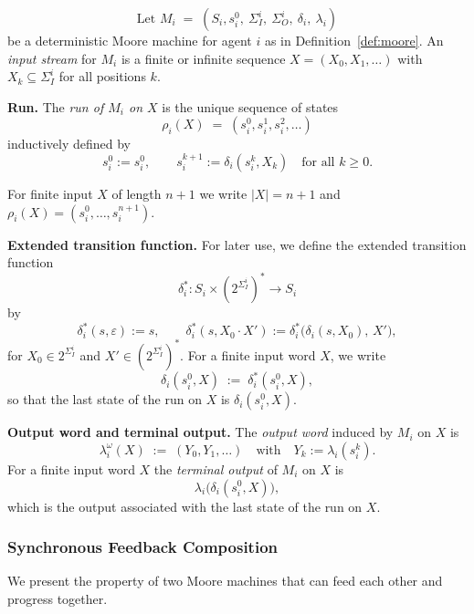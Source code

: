   \begin{definition}
    \label{def:moore-run}
    \[\text{Let }
    M_i \;=\; (S_i, s^0_i,\ \Sigma_I^i,\ \Sigma_O^i,\ \delta_i,\ \lambda_i)
    \]
    be a deterministic Moore machine for agent $i$ as in Definition~\ref{def:moore}.
    An \emph{input stream} for $M_i$ is a finite or infinite sequence 
    $X = (X_0,X_1,\dots)$ with $X_k \subseteq \Sigma_I^i$ for all positions $k$.
    
    \medskip
    \noindent\textbf{Run.}
    The \emph{run of $M_i$ on $X$} is the unique sequence of states
    \[
    \rho_i(X) \;=\; (s^0_i,s^1_i,s^2_i,\dots)
    \]
    inductively defined by
    \[
    s^{0}_i := s^0_i,
    \qquad
    s^{k+1}_i := \delta_i(s^k_i, X_k)
    \quad\text{for all }k \ge 0.
    \]
    
    \noindent For finite input $X$ of length $n{+}1$ we write $|X|=n{+}1$ and 
    $\rho_i(X) = (s^0_i,\dots,s^{n+1}_i)$.
    
    \medskip
    \noindent\textbf{Extended transition function.}
    For later use, we define the extended transition function
    \[
    \delta_i^{*} : S_i \times (2^{\Sigma_I^i})^{*} \to S_i
    \]
    by
    \[
    \delta_i^{*}(s, \varepsilon) := s,
    \qquad
    \delta_i^{*}(s, X_0\cdot X') := 
    \delta_i^{*}\bigl(\delta_i(s,X_0),\,X'\bigr),
    \]
    for $X_0 \in 2^{\Sigma_I^i}$ and $X' \in (2^{\Sigma_I^i})^{*}$.
    For a finite input word $X$, we write
    \[
    \delta_i(s^0_i,X) \;:=\; \delta_i^{*}(s^0_i,X),
    \]
    so that the last state of the run on $X$ is $\delta_i(s^0_i,X)$.
    
    \medskip
    \noindent\textbf{Output word and terminal output.}
    The \emph{output word} induced by $M_i$ on $X$ is
    \[
    \lambda_i^{\omega}(X) \;:=\; (Y_0,Y_1,\dots)
    \quad\text{with}\quad
    Y_k := \lambda_i(s^k_i).
    \]
    For a finite input word $X$ the \emph{terminal output} of $M_i$ on $X$ is
    \[
    \lambda_i\bigl(\delta_i(s^0_i,X)\bigr),
    \]
    which is the output associated with the last state of the run on $X$.
    \end{definition}
  
  \subsubsection{Synchronous Feedback Composition}
  
  We present the property of two Moore machines that can feed each other and progress together.
  
